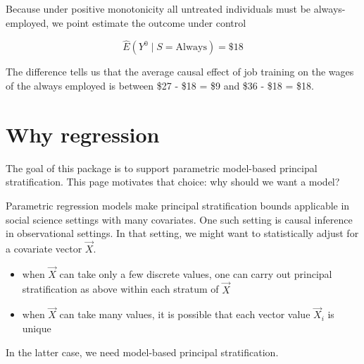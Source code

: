 \documentclass[
]{book}
\providecommand{\tightlist}{%
  \setlength{\itemsep}{0pt}\setlength{\parskip}{0pt}}
\begin{document}
Because under positive monotonicity all untreated individuals must be always-employed, we point estimate the outcome under control

\[\hat{E}(Y^0\mid S = \text{Always}) = \$18\]

The difference tells us that the average causal effect of job training on the wages of the always employed is between \$27 - \$18 = \$9 and \$36 - \$18 = \$18.

\chapter{Why regression}\label{why-regression}

The goal of this package is to support parametric model-based principal stratification. This page motivates that choice: why should we want a model?

Parametric regression models make principal stratification bounds applicable in social science settings with many covariates. One such setting is causal inference in observational settings. In that setting, we might want to statistically adjust for a covariate vector \(\vec{X}\).

\begin{itemize}
\tightlist
\item
  when \(\vec{X}\) can take only a few discrete values, one can carry out principal stratification as above within each stratum of \(\vec{X}\)
\item
  when \(\vec{X}\) can take many values, it is possible that each vector value \(\vec{X}_i\) is unique
\end{itemize}

In the latter case, we need model-based principal stratification.
\end{document}
